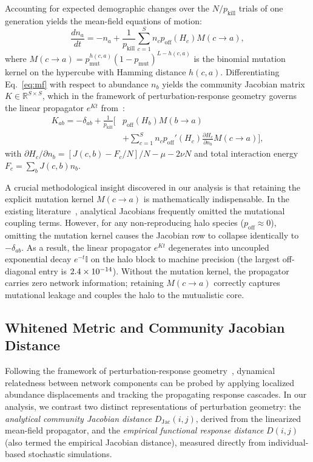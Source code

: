 \documentclass[twocolumn,amsmath,amssymb,aps,pra,10pt,floatfix,nofootinbib]{revtex4-2}
\begin{document}
Accounting for expected demographic changes over the $N / p_{\text{kill}}$ trials of one generation yields the mean-field equations of motion\footnotemark[2]:
\begin{equation}
\frac{dn_a}{dt} = -n_a + \frac{1}{p_{\text{kill}}} \sum_{c=1}^S n_c p_{\text{off}}(H_c) M(c \to a),
\label{eq:mf}
\end{equation}
where $M(c \to a) = p_{\text{mut}}^{h(c,a)} (1 - p_{\text{mut}})^{L - h(c,a)}$ is the binomial mutation kernel on the hypercube with Hamming distance $h(c,a)$. Differentiating Eq.~\eqref{eq:mf} with respect to abundance $n_b$ yields the community Jacobian matrix $K \in \mathbb{R}^{S \times S}$, which in the framework of perturbation-response geometry governs the linear propagator $e^{Kt}$ from~\cite{barzon2024unraveling}:
\begin{equation}
\begin{split}
K_{ab} = -\delta_{ab} + \frac{1}{p_{\text{kill}}} \Bigg[ & p_{\text{off}}(H_b) M(b \to a) \\
& + \sum_{c=1}^S n_c p_{\text{off}}'(H_c) \frac{\partial H_c}{\partial n_b} M(c \to a) \Bigg],
\end{split}
\label{eq:K}
\end{equation}
with $\partial H_c / \partial n_b = [J(c,b) - F_c / N] / N - \mu - 2\nu N$ and total interaction energy $F_c = \sum_b J(c,b) n_b$.

A crucial methodological insight discovered in our analysis is that retaining the explicit mutation kernel $M(c \to a)$ is mathematically indispensable\footnotemark[2]. In the existing literature~\cite{cairoli2014forecasting}, analytical Jacobians frequently omitted the mutational coupling terms. However, for any non-reproducing halo species ($p_{\text{off}} \approx 0$), omitting the mutation kernel causes the Jacobian row to collapse identically to $-\delta_{ab}$. As a result, the linear propagator $e^{Kt}$ degenerates into uncoupled exponential decay $e^{-t} \mathbb{I}$ on the halo block to machine precision (the largest off-diagonal entry is $2.4\times10^{-14}$). Without the mutation kernel, the propagator carries zero network information; retaining $M(c \to a)$ correctly captures mutational leakage and couples the halo to the mutualistic core.

\subsection{Whitened Metric and Community Jacobian Distance}

Following the framework of perturbation-response geometry~\cite{barzon2024unraveling}, dynamical relatedness between network components can be probed by applying localized abundance displacements and tracking the propagating response cascades. In our analysis, we contrast two distinct representations of perturbation geometry: the \textit{analytical community Jacobian distance} $D_{\text{Jac}}(i,j)$, derived from the linearized mean-field propagator, and the \textit{empirical functional response distance} $D(i,j)$ (also termed the empirical Jacobian distance), measured directly from individual-based stochastic simulations.
\end{document}
